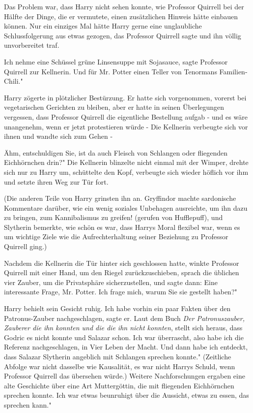 Das Problem war, dass Harry nicht sehen konnte, wie Professor Quirrell bei der
Hälfte der Dinge, die er vermutete, einen zusätzlichen Hinweis hätte einbauen
können. Nur ein einziges Mal hätte Harry gerne eine unglaubliche
Schlussfolgerung aus etwas gezogen, das Professor Quirrell sagte und ihn völlig
unvorbereitet traf.

\glqq{}Ich nehme eine Schüssel grüne Linsensuppe mit Sojasauce\grqq{}, sagte
Professor Quirrell zur Kellnerin. \glqq{}Und für Mr. Potter einen Teller von
Tenormans Familien-Chili."

Harry zögerte in plötzlicher Bestürzung. Er hatte sich vorgenommen, vorerst bei
vegetarischen Gerichten zu bleiben, aber er hatte in seinen Überlegungen
vergessen, dass Professor Quirrell die eigentliche Bestellung aufgab - und es
wäre unangenehm, wenn er jetzt protestieren würde - Die Kellnerin verbeugte sich
vor ihnen und wandte sich zum Gehen -

\glqq{}Ähm, entschuldigen Sie, ist da auch Fleisch von Schlangen oder fliegenden
Eichhörnchen drin?" Die Kellnerin blinzelte nicht einmal mit der Wimper, drehte
sich nur zu Harry um, schüttelte den Kopf, verbeugte sich wieder höflich vor ihm
und setzte ihren Weg zur Tür fort.

(Die anderen Teile von Harry grinsten ihn an. Gryffindor machte sardonische
Kommentare darüber, wie ein wenig soziales Unbehagen ausreichte, um ihn dazu zu
bringen, zum Kannibalismus zu greifen! (gerufen von Hufflepuff), und Slytherin
bemerkte, wie schön es war, dass Harrys Moral flexibel war, wenn es um wichtige
Ziele wie die Aufrechterhaltung seiner Beziehung zu Professor Quirrell ging.)

Nachdem die Kellnerin die Tür hinter sich geschlossen hatte, winkte Professor
Quirrell mit einer Hand, um den Riegel zurückzuschieben, sprach die üblichen
vier Zauber, um die Privatsphäre sicherzustellen, und sagte dann: \glqq{}Eine
interessante Frage, Mr. Potter. Ich frage mich, warum Sie sie gestellt haben?"

Harry behielt sein Gesicht ruhig. \glqq{}Ich habe vorhin ein paar Fakten über den
Patronus-Zauber nachgeschlagen\grqq{}, sagte er. \glqq{}Laut dem Buch \emph{Der
Patronuszauber, Zauberer die ihn konnten und die die ihn nicht konnten}, stellt
sich heraus, dass Godric es nicht konnte und Salazar schon. Ich war überrascht,
also habe ich die Referenz nachgeschlagen, in Vier Leben der Macht. Und dann
habe ich entdeckt, dass Salazar Slytherin angeblich mit Schlangen sprechen
konnte." (Zeitliche Abfolge war nicht dasselbe wie Kausalität, es war nicht
Harrys Schuld, wenn Professor Quirrell das übersehen würde.) \glqq{}Weitere
Nachforschungen ergaben eine alte Geschichte über eine Art Muttergöttin, die mit
fliegenden Eichhörnchen sprechen konnte. Ich war etwas beunruhigt über die
Aussicht, etwas zu essen, das sprechen kann."

